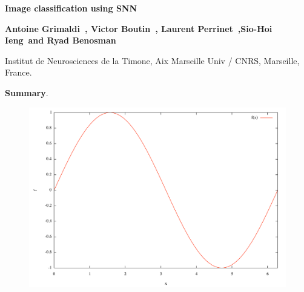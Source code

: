 \documentclass[12pt,draft]{article}
\newcommand{\AuthorAG}{Antoine Grimaldi}
\newcommand{\AuthorLP}{Laurent Perrinet}
\newcommand{\AuthorVB}{Victor Boutin}
\newcommand{\AuthorSI}{Sio-Hoi Ieng}
\newcommand{\AuthorRB}{Ryad Benosman}%
\begin{document}
{\Large\bf  
Image classification using SNN
}

{\bf
\AuthorAG\ , \AuthorVB\ , \AuthorLP\ ,\AuthorSI\ and \AuthorRB}

{ 
Institut de Neurosciences de la Timone, Aix Marseille Univ / CNRS, Marseille, France.
}


\parindent 12pt

\textbf{Summary}. 




\begin{figure}[!ht]%
\includegraphics[width=0.99\linewidth]{figure1}
\end{figure}

\caption
{
\textbf{Figure 1}: (a) 
}


\vfil 


\printbibliography
\end{document}
